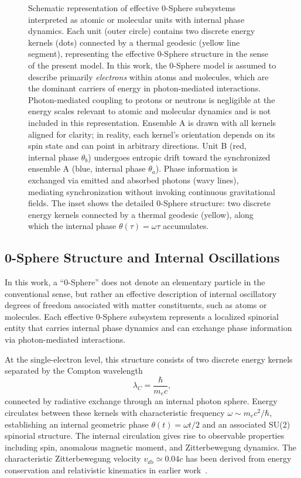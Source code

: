 \documentclass[%
 reprint,
 amsmath,amssymb,
 aps,
 prb,
]{revtex4-2}
\numberwithin{equation}{section}
\begin{document}
\begin{figure}[t!]
\centering 

\caption{\justifying
Schematic representation of effective 0-Sphere subsystems interpreted as atomic or molecular units with internal phase dynamics. Each unit (outer circle) contains two discrete energy kernels (dots) connected by a thermal geodesic (yellow line segment), representing the effective 0-Sphere structure in the sense of the present model. In this work, the 0-Sphere model is assumed to describe primarily \textit{electrons} within atoms and molecules, which are the dominant carriers of energy in photon-mediated interactions. Photon-mediated coupling to protons or neutrons is negligible at the energy scales relevant to atomic and molecular dynamics and is not included in this representation. Ensemble A is drawn with all kernels aligned for clarity; in reality, each kernel's orientation depends on its spin state and can point in arbitrary directions. Unit B (red, internal phase $\theta_b$) undergoes entropic drift toward the synchronized ensemble A (blue, internal phase $\theta_a$). Phase information is exchanged via emitted and absorbed photons (wavy lines), mediating synchronization without invoking continuous gravitational fields. The inset shows the detailed 0-Sphere structure: two discrete energy kernels connected by a thermal geodesic (yellow), along which the internal phase $\theta(\tau) = \omega \tau$ accumulates.
}
\label{fig:entrainment}
\end{figure}

\subsection{0-Sphere Structure and Internal Oscillations}

In this work, a ``0-Sphere'' does not denote an elementary particle in the conventional sense, but rather an effective description of internal oscillatory degrees of freedom associated with matter constituents, such as atoms or molecules. Each effective 0-Sphere subsystem represents a localized spinorial entity that carries internal phase dynamics and can exchange phase information via photon-mediated interactions.

At the single-electron level, this structure consists of two discrete energy kernels separated by the Compton wavelength
\begin{equation}
\lambda_C = \frac{\hbar}{m_e c},
\label{eq:compton_wavelength}
\end{equation}
connected by radiative exchange through an internal photon sphere. Energy circulates between these kernels with characteristic frequency $\omega \sim m_e c^2/\hbar$, establishing an internal geometric phase $\theta(t) = \omega t/2$ and an associated SU(2) spinorial structure. The internal circulation gives rise to observable properties including spin, anomalous magnetic moment, and Zitterbewegung dynamics. The characteristic Zitterbewegung velocity $v_\text{zb} \simeq 0.04c$ has been derived from energy conservation and relativistic kinematics in earlier work~\cite{Hanamura2024Quantum}.
\end{document}
